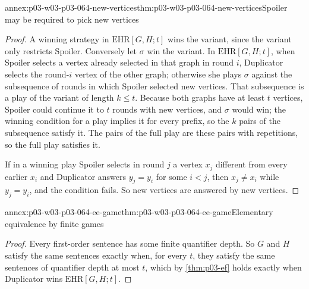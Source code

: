 \begin{annexitem}{annex:p03-w03-p03-064-new-vertices}{thm:p03-w03-p03-064-new-vertices}{Spoiler may be required to pick new vertices}
\begin{proof}
A winning strategy in \(\mathrm{EHR}[G,H;t]\) wins the variant, since the
variant only restricts Spoiler.  Conversely let \(\sigma\) win the variant.
In \(\mathrm{EHR}[G,H;t]\), when Spoiler selects a vertex already selected in
that graph in round \(i\), Duplicator selects the round-\(i\) vertex of the
other graph; otherwise she plays \(\sigma\) against the subsequence of rounds
in which Spoiler selected new vertices.  That subsequence is a play of the
variant of length \(k\leq t\).  Because both graphs have at least \(t\)
vertices, Spoiler could continue it to \(t\) rounds with new vertices, and
\(\sigma\) would win; the winning condition for a play implies it for every
prefix, so the \(k\) pairs of the subsequence satisfy it.  The pairs of the
full play are these pairs with repetitions, so the full play satisfies it.

If in a winning play Spoiler selects in round \(j\) a vertex \(x_j\) different
from every earlier \(x_i\) and Duplicator answers \(y_j=y_i\) for some
\(i<j\), then \(x_j\neq x_i\) while \(y_j=y_i\), and the condition fails.  So
new vertices are answered by new vertices.
\end{proof}
\end{annexitem}

\begin{annexitem}{annex:p03-w03-p03-064-ee-game}{thm:p03-w03-p03-064-ee-game}{Elementary equivalence by finite games}
\begin{proof}
Every first-order sentence has some finite quantifier depth.  So \(G\) and
\(H\) satisfy the same sentences exactly when, for every \(t\), they satisfy
the same sentences of quantifier depth at most \(t\), which by
\cref{thm:p03-ef} holds exactly when Duplicator wins
\(\mathrm{EHR}[G,H;t]\).
\end{proof}
\end{annexitem}

